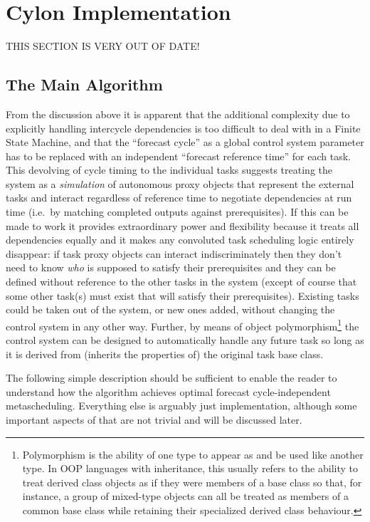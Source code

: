 \documentclass[11pt,a4paper]{article}
\begin{document}
\section{Cylon Implementation}

{\huge THIS SECTION IS VERY OUT OF DATE!}

\subsection{The Main Algorithm}

From the discussion above it is apparent that the additional complexity
due to explicitly handling intercycle dependencies is too difficult to
deal with in a Finite State Machine, and that the ``forecast cycle'' as
a global control system parameter has to be replaced with an independent
``forecast reference time'' for each task. This devolving of cycle
timing to the individual tasks suggests treating the system as a {\em
simulation} of autonomous proxy objects that represent the external
tasks and interact regardless of reference time to negotiate
dependencies at run time (i.e.\ by matching completed outputs against
prerequisites). If this can be made to work it provides extraordinary
power and flexibility because it treats all dependencies equally and it
makes any convoluted task scheduling logic entirely disappear: if task
proxy objects can interact indiscriminately then they don't need to know
{\em who} is supposed to satisfy their prerequisites and they can be
defined without reference to the other tasks in the system (except of
course that some other task(s) must exist that will satisfy their
prerequisites).  Existing tasks could be taken out of the system, or new
ones added, without changing the control system in any other way.
Further, by means of object polymorphism\footnote{Polymorphism is the
ability of one type to appear as and be used like another type. In OOP
languages with inheritance, this usually refers to the ability to treat
derived class objects as if they were members of a base class so that,
for instance, a group of mixed-type objects can all be treated as
members of a common base class while retaining their specialized derived
class behaviour.} the control system can be designed to automatically
handle any future task so long as it is derived from (inherits the
properties of) the original task base class.

The following simple description should be sufficient to enable the
reader to understand how the algorithm achieves optimal forecast
cycle-independent metascheduling. Everything else is arguably just
implementation, although some important aspects of that are not trivial
and will be discussed later.
\end{document}

